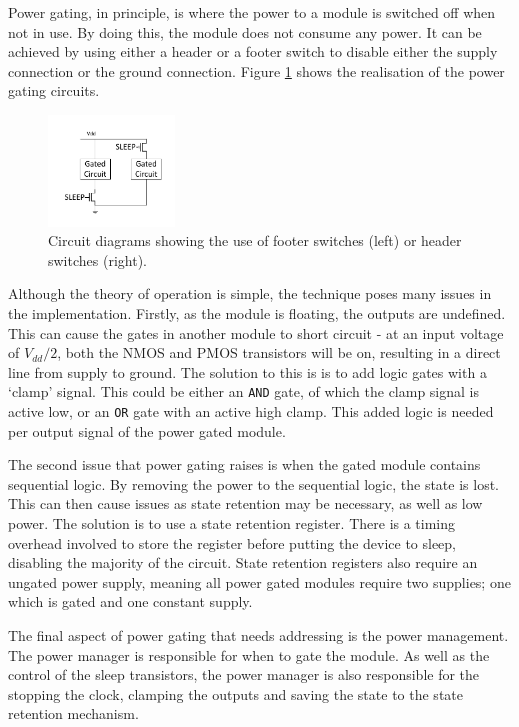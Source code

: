 Power gating, in principle, is where the power to a module is switched off when not in use. 
By doing this, the module does not consume any power. 
It can be achieved by using either a header or a footer switch to disable either the supply connection or the ground connection. 
Figure \ref{fig:powerswitches} shows the realisation of the power gating circuits.

\begin{figure}[h]
\centering
\includegraphics[width=0.3\textwidth]{Figures/powergating_switches.pdf}
\caption{Circuit diagrams showing the use of footer switches (left) or header switches (right).}
\label{fig:powerswitches}
\end{figure}

Although the theory of operation is simple, the technique poses many issues in the implementation.
Firstly, as the module is floating, the outputs are undefined.
This can cause the gates in another module to short circuit - at an input voltage of $ V_{dd} / 2 $, both the NMOS and PMOS transistors will be on, resulting in a direct line from supply to ground. 
The solution to this is is to add logic gates with a `clamp' signal. 
This could be either an \texttt{AND} gate, of which the clamp signal is active low, or an \texttt{OR} gate with an active high clamp. 
This added logic is needed per output signal of the power gated module.

The second issue that power gating raises is when the gated module contains sequential logic. 
By removing the power to the sequential logic, the state is lost. 
This can then cause issues as state retention may be necessary, as well as low power.
The solution is to use a state retention register. 
There is a timing overhead involved to store the register before putting the device to sleep, disabling the majority of the circuit. 
State retention registers also require an ungated power supply, meaning all power gated modules require two supplies; one which is gated and one constant supply.

The final aspect of power gating that needs addressing is the power management.
The power manager is responsible for when to gate the module.%
As well as the control of the sleep transistors, the power manager is also responsible for the stopping the clock, clamping the outputs and saving the state to the state retention mechanism.

